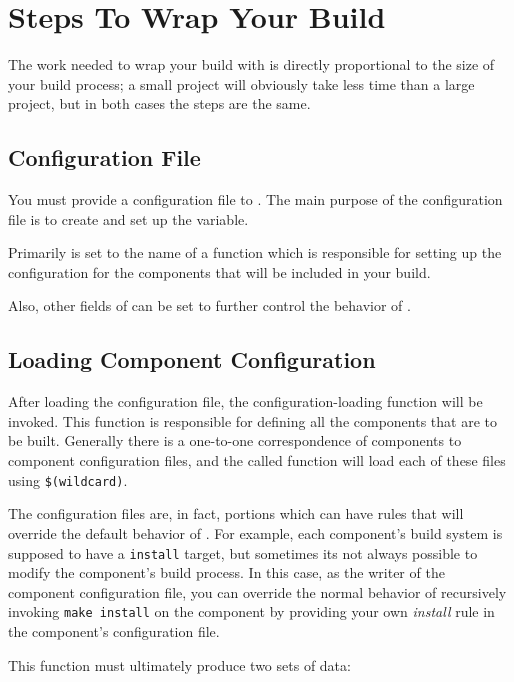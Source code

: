\section{Steps To Wrap Your Build}

The work needed to wrap your build with \lmsbw is directly
proportional to the size of your build process; a small project will
obviously take less time than a large project, but in both cases the
steps are the same.

\subsection{Configuration File}

You must provide a configuration file to \lmsbw.  The main purpose of
the configuration file is to create and set up the \lmsbwconfiguration
variable.

Primarily  is set
to the name of a function which is responsible for setting up the
configuration for the components that will be included in your build.

Also, other fields of \lmsbwconfiguration can be set to further
control the behavior of \lmsbw.

\subsection{Loading Component Configuration}

After loading the configuration file, the configuration-loading
function will be invoked.  This function is responsible for defining
all the components that are to be built.  Generally there is a
one-to-one correspondence of components to component configuration
files, and the called function will load each of these files using
\gnumake \texttt{\$(wildcard)}.

The configuration files are, in fact, \makefile portions which can
have rules that will override the default behavior of \lmsbw.  For
example, each component's build system is supposed to have a
\texttt{install} target, but sometimes its not always possible to
modify the component's build process.  In this case, as the writer of
the component configuration file, you can override the normal \lmsbw
behavior of recursively invoking \texttt{make install} on the
component by providing your own \emph{install} rule in the component's
configuration file.

This function must ultimately produce two sets of data:

